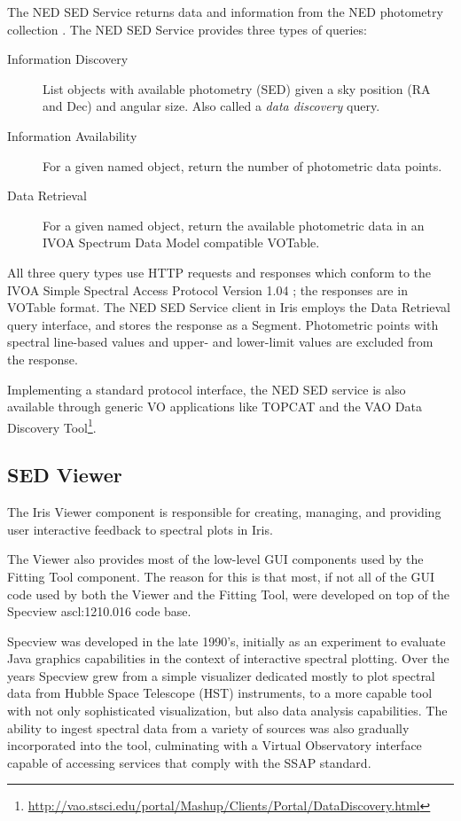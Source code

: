 \documentclass[preprint,authoryear,5p]{elsarticle}
\begin{document}
\begin{sloppypar}
The NED SED Service returns data and information from the NED photometry
collection \citep{2007ASPC..376..153M}. The NED SED Service provides three types
of queries:
\end{sloppypar}

\begin{description}
\item[Information Discovery] List objects with
available photometry (SED) given a sky position (RA and Dec) and angular size.
Also called a \emph{data discovery} query. 
\item[Information Availability] For
a given named object, return the number of photometric data points. 
\item[Data Retrieval] For a given named object, return the
available photometric data in an IVOA Spectrum Data Model compatible VOTable.
\end{description}

All three query types use HTTP requests and responses which conform to the 
IVOA Simple Spectral Access Protocol Version 1.04 \citep[SSAP;][]{2012arXiv1203.5725T}; 
the responses are in VOTable format. The NED SED Service client in Iris
employs the Data Retrieval query interface, and stores the
response as a Segment. Photometric points with spectral line-based values and
upper- and lower-limit values are excluded from the response.

Implementing a standard protocol interface, the NED SED service is also
available through generic VO applications like TOPCAT and the VAO Data Discovery
Tool\footnote{\url{http://vao.stsci.edu/portal/Mashup/Clients/Portal/DataDiscovery.html}}.

\subsection{SED Viewer} \label{subsec:specview}
The Iris Viewer component is responsible for creating, managing, and providing
user interactive feedback to spectral plots in Iris.

The Viewer also provides most of the low-level GUI
components used by the Fitting Tool component. The reason for this is that most,
if not all of the GUI code used by both the Viewer and the Fitting Tool, were
developed on top of the Specview ascl:1210.016 \citep{2002ASPC..281..120B} code base.

Specview was developed in the late 1990's, initially as an experiment to evaluate
Java graphics capabilities in the context of interactive spectral plotting. Over
the years Specview grew from a simple visualizer dedicated mostly to plot
spectral data from Hubble Space Telescope (HST) instruments, to a more capable
tool with not only sophisticated visualization, but also data analysis
capabilities. The ability to ingest spectral data from a variety of sources was
also gradually incorporated into the tool, culminating with a Virtual
Observatory interface capable of accessing services that comply with the
SSAP standard.
\end{document}
